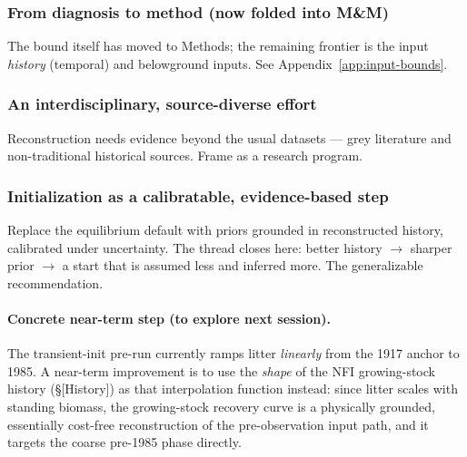 \documentclass[11pt]{article}
\begin{document}
\subsubsection{From diagnosis to method (now folded into M\&M)}
The bound itself has moved to Methods; the remaining frontier is the input
\emph{history} (temporal) and belowground inputs. See Appendix~\ref{app:input-bounds}.

\subsubsection{An interdisciplinary, source-diverse effort}
Reconstruction needs evidence beyond the usual datasets --- grey literature
and non-traditional historical sources. Frame as a research program.

\subsubsection{Initialization as a calibratable, evidence-based step}
Replace the equilibrium default with priors grounded in reconstructed history,
calibrated under uncertainty. The thread closes here: better history $\to$
sharper prior $\to$ a start that is assumed less and inferred more. The
generalizable recommendation.

\paragraph{Concrete near-term step (to explore next session).}
The transient-init pre-run currently ramps litter \emph{linearly} from the 1917
anchor to 1985. A near-term improvement is to use the \emph{shape} of the NFI
growing-stock history (\S[History]) as that interpolation function instead: since
litter scales with standing biomass, the growing-stock recovery curve is a
physically grounded, essentially cost-free reconstruction of the pre-observation
input path, and it targets the coarse pre-1985 phase directly.
\end{document}
